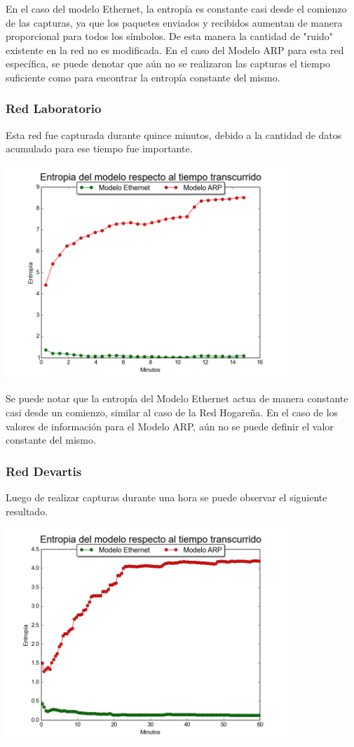 En el caso del modelo Ethernet, la entropía es constante casi desde el comienzo de las capturas, ya que los paquetes enviados y recibidos aumentan de manera proporcional para todos los símbolos. De esta manera la cantidad de "ruido" existente en la red no es modificada. En el caso del Modelo ARP para esta red específica, se puede denotar que aún no se realizaron las capturas el tiempo suficiente como para encontrar la entropía constante del mismo. 

\subsubsection{Red Laboratorio}
Esta red fue capturada durante quince minutos, debido a la cantidad de datos acumulado para ese tiempo fue importante. 

\centerline{\includegraphics[width=0.8\textwidth]{./graficos/entrophyVSTime/labo5.png}}

Se puede notar que la entropía del Modelo Ethernet actua de manera constante casi desde un comienzo, similar al caso de la Red Hogareña. En el caso de los valores de información para el Modelo ARP, aún no se puede definir el valor constante del mismo. 

\subsubsection{Red Devartis}
Luego de realizar capturas durante una hora se puede observar el siguiente resultado. 

\centerline{\includegraphics[width=0.8\textwidth]{./graficos/entrophyVSTime/laburo_mari.png}}

